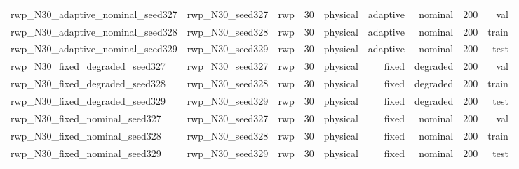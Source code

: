 \begin{tabular}{lrrrrrrrr}
rwp\_N30\_adaptive\_nominal\_seed327 & rwp\_N30\_seed327 & rwp & 30 & physical & adaptive & nominal & 200 & val \\
rwp\_N30\_adaptive\_nominal\_seed328 & rwp\_N30\_seed328 & rwp & 30 & physical & adaptive & nominal & 200 & train \\
rwp\_N30\_adaptive\_nominal\_seed329 & rwp\_N30\_seed329 & rwp & 30 & physical & adaptive & nominal & 200 & test \\
rwp\_N30\_fixed\_degraded\_seed327 & rwp\_N30\_seed327 & rwp & 30 & physical & fixed & degraded & 200 & val \\
rwp\_N30\_fixed\_degraded\_seed328 & rwp\_N30\_seed328 & rwp & 30 & physical & fixed & degraded & 200 & train \\
rwp\_N30\_fixed\_degraded\_seed329 & rwp\_N30\_seed329 & rwp & 30 & physical & fixed & degraded & 200 & test \\
rwp\_N30\_fixed\_nominal\_seed327 & rwp\_N30\_seed327 & rwp & 30 & physical & fixed & nominal & 200 & val \\
rwp\_N30\_fixed\_nominal\_seed328 & rwp\_N30\_seed328 & rwp & 30 & physical & fixed & nominal & 200 & train \\
rwp\_N30\_fixed\_nominal\_seed329 & rwp\_N30\_seed329 & rwp & 30 & physical & fixed & nominal & 200 & test \\
\bottomrule
\end{tabular}